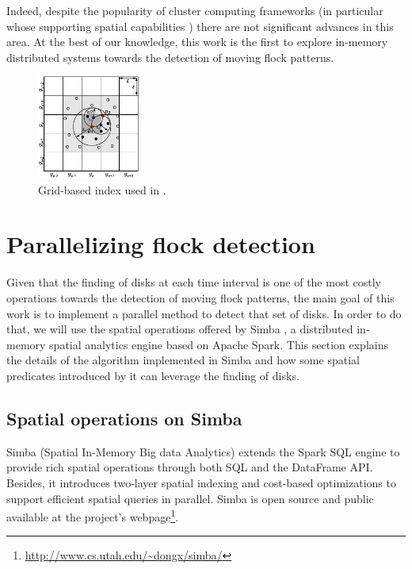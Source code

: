 \documentclass[12pt]{scrartcl}
\begin{document}
Indeed, despite the popularity of cluster computing frameworks (in particular whose supporting spatial capabilities \citep{eldawy_spatialhadoop:_2014, yu_demonstration_2016, pellechia_geomesa:_2015-1, xie_simba:_2016-1}) there are not significant advances in this area.  At the best of our knowledge, this work is the first to explore in-memory distributed systems towards the detection of moving flock patterns.

\begin{figure}
 \centering
 \includegraphics[width=0.3\textwidth]{./figures/grid}
 \caption{Grid-based index used in \cite{vieira_-line_2009}.}
 \label{fig:grid}
\end{figure}

\section{Parallelizing flock detection}\label{sec:flock}
% 

Given that the finding of disks at each time interval is one of the most costly operations towards the detection of moving flock patterns, the main goal of this work is to implement a parallel method to detect that set of disks.  In order to do that, we will use the spatial operations offered by Simba \citep{xie_simba:_2016-1}, a distributed in-memory spatial analytics engine based on Apache Spark. This section explains the details of the algorithm implemented in Simba and how some spatial predicates introduced by it can leverage the finding of disks.

\subsection{Spatial operations on Simba}
Simba (Spatial In-Memory Big data Analytics) extends the Spark SQL engine to provide rich spatial operations through both SQL and the DataFrame API.  Besides, it introduces two-layer spatial indexing and cost-based optimizations to support efficient spatial queries in parallel.  Simba is open source and public available at the project's webpage\footnote{\url{http://www.cs.utah.edu/~dongx/simba/}}.
\end{document}
